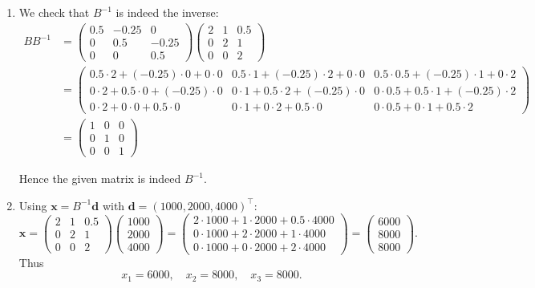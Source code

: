 \documentclass[11pt]{exam}
\begin{document}
\begin{questions}
\begin{solution}
\begin{enumerate}[leftmargin=0.55cm, label=(\alph*), rightmargin=0.2cm]
\item We check that $B^{-1}$ is indeed the inverse:
\begin{align*}
B B^{-1} &=
\begin{pmatrix}
0.5 & -0.25 & 0 \\
0   & 0.5   & -0.25 \\
0   & 0     & 0.5
\end{pmatrix}
\begin{pmatrix}
2 & 1 & 0.5 \\
0 & 2 & 1 \\
0 & 0 & 2
\end{pmatrix} \\
&=
\begin{pmatrix}
0.5\cdot 2 + (-0.25)\cdot 0 + 0\cdot 0 
    & 0.5\cdot 1 + (-0.25)\cdot 2 + 0\cdot 0
    & 0.5\cdot 0.5 + (-0.25)\cdot 1 + 0\cdot 2 \\[4pt]
0\cdot 2 + 0.5\cdot 0 + (-0.25)\cdot 0
    & 0\cdot 1 + 0.5\cdot 2 + (-0.25)\cdot 0
    & 0\cdot 0.5 + 0.5\cdot 1 + (-0.25)\cdot 2 \\[4pt]
0\cdot 2 + 0\cdot 0 + 0.5\cdot 0
    & 0\cdot 1 + 0\cdot 2 + 0.5\cdot 0
    & 0\cdot 0.5 + 0\cdot 1 + 0.5\cdot 2
\end{pmatrix} \\
&=
\begin{pmatrix}
1 & 0 & 0 \\
0 & 1 & 0 \\
0 & 0 & 1
\end{pmatrix}
\end{align*}

Hence the given matrix is indeed $B^{-1}$.

\item Using $\mathbf{x} = B^{-1}\mathbf{d}$ with
$\mathbf{d} = (1000,2000,4000)^\top$:
\[
\mathbf{x}
=
\begin{pmatrix}
2 & 1 & 0.5 \\
0 & 2 & 1 \\
0 & 0 & 2
\end{pmatrix}
\begin{pmatrix}
1000\\[2pt] 2000\\[2pt] 4000
\end{pmatrix}
=
\begin{pmatrix}
2\cdot1000 + 1\cdot2000 + 0.5\cdot4000 \\
0\cdot1000 + 2\cdot2000 + 1\cdot4000 \\
0\cdot1000 + 0\cdot2000 + 2\cdot4000
\end{pmatrix}
=
\begin{pmatrix}
6000\\[2pt] 8000\\[2pt] 8000
\end{pmatrix}.
\]
Thus
\[
x_1 = 6000,\quad x_2 = 8000,\quad x_3 = 8000.
\]


\end{enumerate}
\end{solution}
\end{questions}
\end{document}
